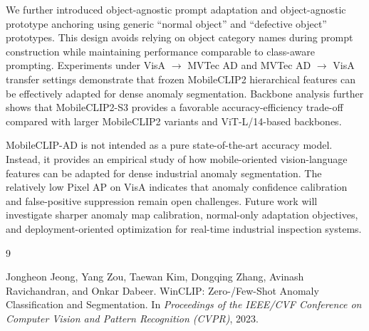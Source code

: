 \documentclass[10pt]{article}
\begin{document}
We further introduced object-agnostic prompt adaptation and object-agnostic prototype anchoring using generic ``normal object'' and ``defective object'' prototypes. This design avoids relying on object category names during prompt construction while maintaining performance comparable to class-aware prompting. Experiments under VisA $\rightarrow$ MVTec AD and MVTec AD $\rightarrow$ VisA transfer settings demonstrate that frozen MobileCLIP2 hierarchical features can be effectively adapted for dense anomaly segmentation. Backbone analysis further shows that MobileCLIP2-S3 provides a favorable accuracy-efficiency trade-off compared with larger MobileCLIP2 variants and ViT-L/14-based backbones.

MobileCLIP-AD is not intended as a pure state-of-the-art accuracy model. Instead, it provides an empirical study of how mobile-oriented vision-language features can be adapted for dense industrial anomaly segmentation. The relatively low Pixel AP on VisA indicates that anomaly confidence calibration and false-positive suppression remain open challenges. Future work will investigate sharper anomaly map calibration, normal-only adaptation objectives, and deployment-oriented optimization for real-time industrial inspection systems.


\begin{thebibliography}{9}

Jongheon Jeong, Yang Zou, Taewan Kim, Dongqing Zhang, Avinash Ravichandran, and Onkar Dabeer.
\newblock WinCLIP: Zero-/Few-Shot Anomaly Classification and Segmentation.
\newblock In \emph{Proceedings of the IEEE/CVF Conference on Computer Vision and Pattern Recognition (CVPR)}, 2023.

\end{thebibliography}
\end{document}
